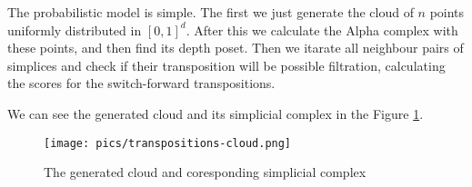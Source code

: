 \par The probabilistic model is simple. The first we just generate the cloud of $n$ points uniformly distributed in $[0, 1]^d$. After this we calculate the Alpha complex with these points, and then find its depth poset. Then we itarate all neighbour pairs of simplices and check if their transposition will be possible filtration, calculating the scores for the switch-forward transpositions.
\par We can see the generated cloud and its simplicial complex in the Figure \ref{fig:cloud}.

\begin{figure}[ht]
\centering
\texttt{[image: pics/transpositions-cloud.png]}
\label{fig:cloud}
\caption{The generated cloud and coresponding simplicial complex}
\end{figure}